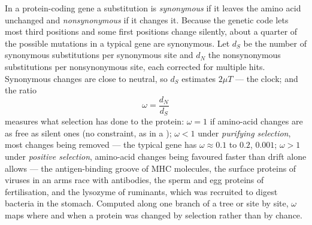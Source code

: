 \begin{definition}[dN/dS]\label{def:b3:molecular-evolution:dnds}
In a protein-coding gene a substitution is \emph{synonymous} if it
leaves the amino acid unchanged and \emph{nonsynonymous} if it
changes it. Because the genetic code lets most third positions and
some first positions change silently, about a quarter of the possible
mutations in a typical gene are synonymous. Let $d_{S}$ be the number
of synonymous substitutions per synonymous site and $d_{N}$ the
nonsynonymous substitutions per nonsynonymous site, each corrected for
multiple hits. Synonymous changes are close to neutral, so $d_{S}$
estimates $2\mu T$ --- the clock; and the ratio
\[
\omega = \frac{d_{N}}{d_{S}}
\]
measures what selection has done to the protein: $\omega = 1$ if
amino-acid changes are as free as silent ones (no constraint, as in a
); $\omega < 1$ under \emph{purifying selection}, most changes
being removed --- the typical gene has $\omega \approx 0.1$ to $0.2$,
 $0.001$; $\omega > 1$ under \emph{positive selection}, amino-acid
changes being favoured faster than drift alone allows --- the
antigen-binding groove of MHC molecules, the surface proteins of viruses
in an arms race with antibodies, the sperm and egg proteins of
fertilisation, and the lysozyme of ruminants, which was recruited to
digest bacteria in the stomach. Computed along one branch of a tree or
site by site, $\omega$ maps where and when a protein was changed by
selection rather than by chance.
\end{definition}

